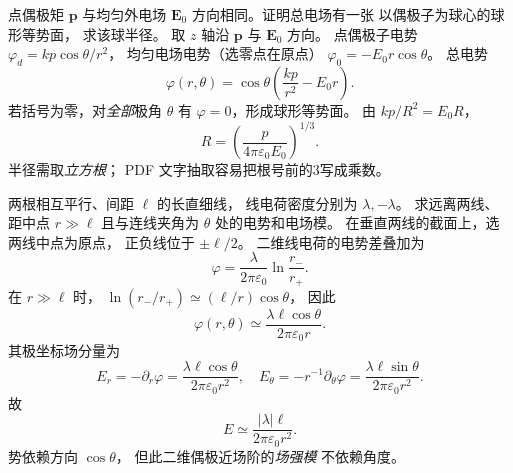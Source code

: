 点偶极矩 $\bm p$ 与均匀外电场 $\bm E_0$
方向相同。证明总电场有一张
以偶极子为球心的球形等势面，
求该球半径。
\exsolution
取 $z$ 轴沿 $\bm p$ 与 $\bm E_0$ 方向。
点偶极子电势
$\varphi_d=kp\cos\theta/r^2$，
均匀电场电势（选零点在原点）
$\varphi_0=-E_0r\cos\theta$。
总电势
\[
\varphi(r,\theta)=
\cos\theta\left(\frac{kp}{r^2}-E_0r\right).
\]
若括号为零，对\emph{全部}极角 $\theta$
有 $\varphi=0$，形成球形等势面。
由 $kp/R^2=E_0R$，
\[
\boxed{R=\left(\frac{p}{4\pi\varepsilon_0E_0}\right)^{1/3}}.
\]
\excheck 半径需取\emph{立方根}；
PDF 文字抽取容易把根号前的3写成乘数。

两根相互平行、间距 $\ell$ 的长直细线，
线电荷密度分别为 $\lambda,-\lambda$。
求远离两线、距中点 $r\gg\ell$
且与连线夹角为 $\theta$ 处的电势和电场模。
\exsolution
在垂直两线的截面上，选两线中点为原点，
正负线位于 $\pm\bm \ell/2$。
二维线电荷的电势差叠加为
\[
\varphi=\frac{\lambda}{2\pi\varepsilon_0}
\ln\frac{r_-}{r_+}.
\]
在 $r\gg\ell$ 时，
$\ln(r_-/r_+)\simeq(\ell/r)\cos\theta$，
因此
\[
\boxed{\varphi(r,\theta)\simeq
\frac{\lambda\ell\cos\theta}{2\pi\varepsilon_0r}}.
\]
其极坐标场分量为
\[
E_r=-\partial_r\varphi=
\frac{\lambda\ell\cos\theta}{2\pi\varepsilon_0r^2},
\quad
E_\theta=-r^{-1}\partial_\theta\varphi=
\frac{\lambda\ell\sin\theta}{2\pi\varepsilon_0r^2}.
\]
故
\[
\boxed{E\simeq\frac{|\lambda|\ell}{2\pi\varepsilon_0r^2}}.
\]
\excheck 势依赖方向 $\cos\theta$，
但此二维偶极近场阶的\emph{场强模}
不依赖角度。

